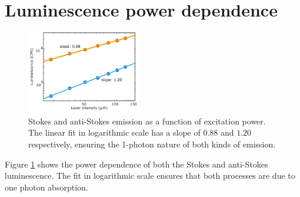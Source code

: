 \documentclass[journal=nalefd,manuscript=letter]{achemso}
\begin{document}
\section{Luminescence power dependence}
\begin{figure}[htp] \centering
\includegraphics[width=0.45\textwidth]{Figures/Supplementary/01_AS_S_in_Log/01_AS_S_in_Log.png}
\caption{Stokes and anti-Stokes emission as a function of excitation power. The
linear fit in logarithmic scale has a slope of $0.88$ and $1.20$ respectively,
ensuring the 1-photon nature of both kinds of emission.}
	\label{fig:Log_Plot}
\end{figure}

Figure \ref{fig:Log_Plot} shows the power dependence of both the Stokes and
anti-Stokes luminescence. The fit in logarithmic scale ensures that both
processes are due to one photon absorption. 


\end{document}
